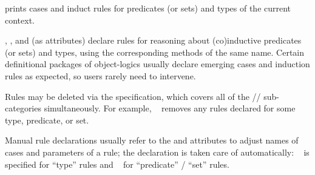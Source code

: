 \begin{isabellebody}
\begin{isamarkuptext}
  \begin{description}

  \item \hyperlink{command.print-induct-rules}{\mbox{}} prints cases and induct rules
  for predicates (or sets) and types of the current context.

  \item \hyperlink{attribute.cases}{\mbox{}}, \hyperlink{attribute.induct}{\mbox{}}, and \hyperlink{attribute.coinduct}{\mbox{}} (as attributes) declare rules for reasoning about
  (co)inductive predicates (or sets) and types, using the
  corresponding methods of the same name.  Certain definitional
  packages of object-logics usually declare emerging cases and
  induction rules as expected, so users rarely need to intervene.

  Rules may be deleted via the  specification, which
  covers all of the //
  sub-categories simultaneously.  For example, \hyperlink{attribute.cases}{\mbox{}}~ removes any \hyperlink{attribute.cases}{\mbox{}} rules declared for
  some type, predicate, or set.
  
  Manual rule declarations usually refer to the \hyperlink{attribute.case-names}{\mbox{}} and \hyperlink{attribute.params}{\mbox{}} attributes to adjust names of
  cases and parameters of a rule; the \hyperlink{attribute.consumes}{\mbox{}}
  declaration is taken care of automatically: \hyperlink{attribute.consumes}{\mbox{}}~ is specified for ``type'' rules and \hyperlink{attribute.consumes}{\mbox{}}~ for ``predicate'' / ``set'' rules.

  \end{description}%
\end{isamarkuptext}%
\isamarkuptrue%
%
\isadelimtheory
%
\endisadelimtheory
%
\isatagtheory
{}\isamarkupfalse%
%
\endisatagtheory
{\isafoldtheory}%
%
\isadelimtheory
%
\endisadelimtheory
\isanewline
\end{isabellebody}%
